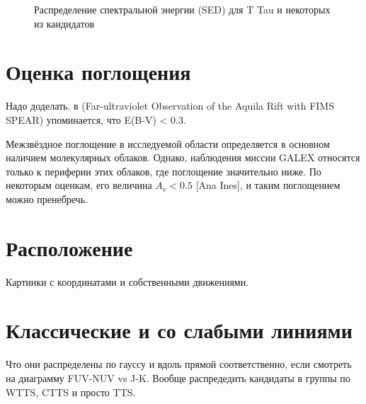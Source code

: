 \begin{figure}[ht]
\begin{minipage}[ht]{0.49\linewidth}
\end{minipage}
\hfill
\begin{minipage}[ht]{0.49\linewidth}
\end{minipage}
\begin{minipage}[ht]{0.49\linewidth}
\end{minipage}
\hfill
\begin{minipage}[ht]{0.49\linewidth}
\end{minipage}
\caption{Распределение спектральной энергии (SED) для T Tau и некоторых из кандидатов}
\label{fig:sed}
\end{figure}

\section{Оценка поглощения}
Надо доделать.
в (Far-ultraviolet Observation of the Aquila Rift with FIMS SPEAR) упоминается, что E(B-V) < 0.3.

Межзвёздное поглощение в исследуемой области определяется в основном наличием молекулярных облаков. Однако, наблюдения миссии GALEX относятся только к периферии этих облаков, где поглощение значительно ниже. По некоторым оценкам, его величина $A_v < 0.5$ [Ana Ines], и таким поглощением можно пренебречь.

\section{Расположение}
Картинки с координатами и собственными движениями.

\section{Классические и со слабыми линиями}
Что они распределены по гауссу и вдоль прямой соответственно, если смотреть на диаграмму FUV-NUV vs J-K. Вообще распредедить кандидаты в группы по WTTS, CTTS и просто TTS.
